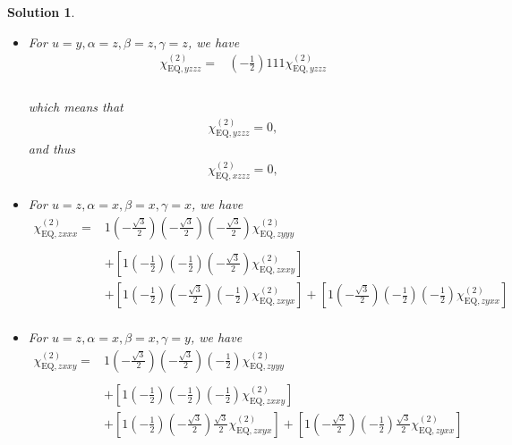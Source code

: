 \documentclass[UTF8,10pt,a4paper]{article}
\theoremstyle{Problem}
\theoremstyle{Solution}
\newtheorem*{sol}{Solution}
\begin{document}
\begin{sol}
\begin{itemize}
\begin{align}
\nonumber&\\
&
\end{align}\normalsize
\item For $u=y,\alpha=z,\beta=z,\gamma=z$, we have
\footnotesize\begin{align}
\nonumber\chi_{\text{EQ},yzzz}^{(2)}=&\left(-\frac{1}{2}\right)111\chi_{\text{EQ},yzzz}^{(2)}\\
\nonumber&\\
\nonumber&\\
\nonumber&\\
&
\end{align}\normalsize
which means that
\begin{align}
    \chi_{\text{EQ},yzzz}^{(2)}=0,
\end{align}
and thus
\begin{align}
    \chi_{\text{EQ},xzzz}^{(2)}=0,
\end{align}
\item For $u=z,\alpha=x,\beta=x,\gamma=x$, we have
\footnotesize\begin{align}
\nonumber\chi_{\text{EQ},zxxx}^{(2)}=&1\left(-\frac{\sqrt{3}}{2}\right)\left(-\frac{\sqrt{3}}{2}\right)\left(-\frac{\sqrt{3}}{2}\right)\chi_{\text{EQ},zyyy}^{(2)}\\
\nonumber&\\
\nonumber&+\left[1\left(-\frac{1}{2}\right)\left(-\frac{1}{2}\right)\left(-\frac{\sqrt{3}}{2}\right)\chi_{\text{EQ},zxxy}^{(2)}\right]\\
\nonumber&+\left[1\left(-\frac{1}{2}\right)\left(-\frac{\sqrt{3}}{2}\right)\left(-\frac{1}{2}\right)\chi_{\text{EQ},zxyx}^{(2)}\right]+\left[1\left(-\frac{\sqrt{3}}{2}\right)\left(-\frac{1}{2}\right)\left(-\frac{1}{2}\right)\chi_{\text{EQ},zyxx}^{(2)}\right]\\
&
\end{align}\normalsize
\item For $u=z,\alpha=x,\beta=x,\gamma=y$, we have
\footnotesize\begin{align}
\nonumber\chi_{\text{EQ},zxxy}^{(2)}=&1\left(-\frac{\sqrt{3}}{2}\right)\left(-\frac{\sqrt{3}}{2}\right)\left(-\frac{1}{2}\right)\chi_{\text{EQ},zyyy}^{(2)}\\
\nonumber&\\
\nonumber&+\left[1\left(-\frac{1}{2}\right)\left(-\frac{1}{2}\right)\left(-\frac{1}{2}\right)\chi_{\text{EQ},zxxy}^{(2)}\right]\\
\nonumber&+\left[1\left(-\frac{1}{2}\right)\left(-\frac{\sqrt{3}}{2}\right)\frac{\sqrt{3}}{2}\chi_{\text{EQ},zxyx}^{(2)}\right]+\left[1\left(-\frac{\sqrt{3}}{2}\right)\left(-\frac{1}{2}\right)\frac{\sqrt{3}}{2}\chi_{\text{EQ},zyxx}^{(2)}\right]\\

\end{align}
\end{itemize}
\end{sol}
\end{document}
